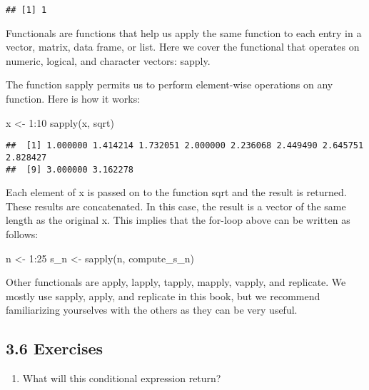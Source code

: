 \documentclass[
]{article}
\newenvironment{Shaded}{\begin{snugshade}}{\end{snugshade}}
\newcommand{\DecValTok}[1]{\textcolor[rgb]{0.00,0.00,0.81}{#1}}
\newcommand{\FunctionTok}[1]{\textcolor[rgb]{0.00,0.00,0.00}{#1}}
\newcommand{\NormalTok}[1]{#1}
\newcommand{\OtherTok}[1]{\textcolor[rgb]{0.56,0.35,0.01}{#1}}
\newcommand{\SpecialCharTok}[1]{\textcolor[rgb]{0.00,0.00,0.00}{#1}}
\providecommand{\tightlist}{%
  \setlength{\itemsep}{0pt}\setlength{\parskip}{0pt}}
\begin{document}
\begin{verbatim}
## [1] 1
\end{verbatim}

Functionals are functions that help us apply the same function to each
entry in a vector, matrix, data frame, or list. Here we cover the
functional that operates on numeric, logical, and character vectors:
sapply.

The function sapply permits us to perform element-wise operations on any
function. Here is how it works:

\begin{Shaded}
\begin{Highlighting}[]
\NormalTok{x }\OtherTok{\textless{}{-}} \DecValTok{1}\SpecialCharTok{:}\DecValTok{10}
\FunctionTok{sapply}\NormalTok{(x, sqrt)}
\end{Highlighting}
\end{Shaded}

\begin{verbatim}
##  [1] 1.000000 1.414214 1.732051 2.000000 2.236068 2.449490 2.645751 2.828427
##  [9] 3.000000 3.162278
\end{verbatim}

Each element of x is passed on to the function sqrt and the result is
returned. These results are concatenated. In this case, the result is a
vector of the same length as the original x. This implies that the
for-loop above can be written as follows:

\begin{Shaded}
\begin{Highlighting}[]
\NormalTok{n }\OtherTok{\textless{}{-}} \DecValTok{1}\SpecialCharTok{:}\DecValTok{25}
\NormalTok{s\_n }\OtherTok{\textless{}{-}} \FunctionTok{sapply}\NormalTok{(n, compute\_s\_n)}
\end{Highlighting}
\end{Shaded}

Other functionals are apply, lapply, tapply, mapply, vapply, and
replicate. We mostly use sapply, apply, and replicate in this book, but
we recommend familiarizing yourselves with the others as they can be
very useful.

\hypertarget{exercises}{%
\subsection{3.6 Exercises}\label{exercises}}

\begin{enumerate}
\def\labelenumi{\arabic{enumi}.}
\tightlist
\item
  What will this conditional expression return?
\end{enumerate}
\end{document}
